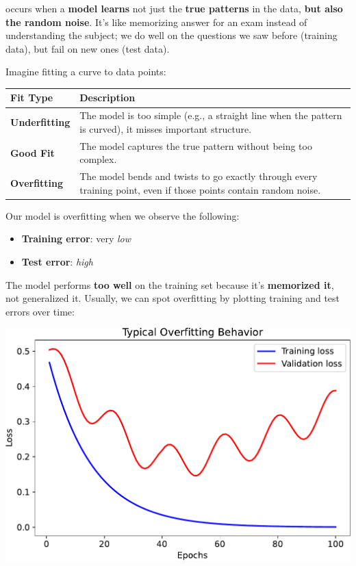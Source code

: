 \begin{remarkbox}
     occurs when a \textbf{model learns} not just the \textbf{true patterns} in the data, \textbf{but also the random noise}. It's like memorizing answer for an exam instead of understanding the subject; we do well on the questions we saw before (training data), but fail on new ones (test data).

    Imagine fitting a curve to data points:
    \begin{center}
        \begin{tabular}{@{} l | p{20em} @{}}
            \toprule
            Fit Type & Description \\
            \midrule
            \textbf{Underfitting}   & The model is too simple (e.g., a straight line when the pattern is curved), it misses important structure. \\ [.5em]
            \textbf{Good Fit}       & The model captures the true pattern without being too complex. \\ [.5em]
            \textbf{Overfitting}    & The model bends and twists to go exactly through every training point, even if those points contain random noise. \\
            \bottomrule
        \end{tabular}
    \end{center}

    \textcolor{Red2}{} Our model is overfitting when we observe the following:
    \begin{multicols}{2}
        \begin{itemize}
            \item \textbf{Training error}: very \emph{low}
            \item \textbf{Test error}: \emph{high}
        \end{itemize}
    \end{multicols}
    The model performs \textbf{too well} on the training set because it's \textbf{memorized it}, not generalized it. Usually, we can spot overfitting by plotting training and test errors over time:
    \begin{center}
        \includegraphics[width=.8\textwidth]{img/neural-networks-and-overfitting/overfitting.pdf}
    \end{center}
\end{remarkbox}

